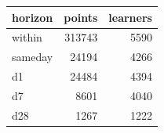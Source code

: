 \begin{tabular}{lrr}
\toprule
horizon & points & learners \\
\midrule
within & 313743 & 5590 \\
sameday & 24194 & 4266 \\
d1 & 24484 & 4394 \\
d7 & 8601 & 4040 \\
d28 & 1267 & 1222 \\
\bottomrule
\end{tabular}
